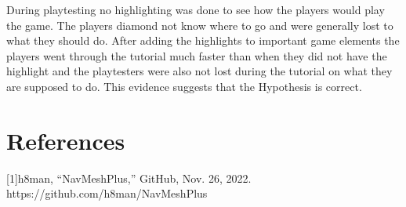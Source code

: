 \documentclass{article}
\begin{document}
During playtesting no highlighting was done to see how the players would play the game. The players diamond
not know where to go and were generally lost to what they should do. After adding the highlights to important
game elements the players went through the tutorial much faster than when they did not have the highlight and
the playtesters were also not lost during the tutorial on what they are supposed to do. This evidence suggests
that the Hypothesis is correct.


\section{References}
[1]h8man, “NavMeshPlus,” GitHub, Nov. 26, 2022. https://github.com/h8man/NavMeshPlus
‌

\glsaddall
\printglossary
\end{document}
